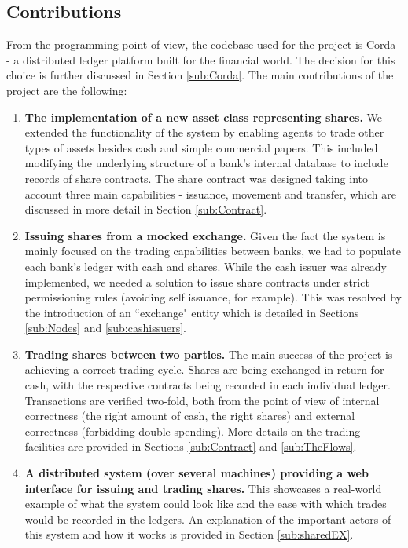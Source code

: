 \documentclass[12pt,twoside]{article}
\begin{document}
\subsection{Contributions}
\label{sec:Contributions}
From the programming point of view, the codebase used for the project is Corda - a distributed ledger platform built for the financial world. The decision for this choice is further discussed in Section \ref{sub:Corda}. The main contributions of the project are the following:
\begin{enumerate}
\item \textbf{The implementation of a new asset class representing shares.} We extended the functionality of the system by enabling agents to trade other types of assets besides cash and simple commercial papers. This included modifying the underlying structure of a bank's internal database to include records of share contracts. The share contract was designed taking into account three main capabilities - issuance, movement and transfer, which are discussed in more detail in Section \ref{sub:Contract}.
\item \textbf{Issuing shares from a mocked exchange.} Given the fact the system is mainly focused on the trading capabilities between banks, we had to populate each bank's ledger with cash and shares. While the cash issuer was already implemented, we needed a solution to issue share contracts under strict permissioning rules (avoiding self issuance, for example). This was resolved by the introduction of an ``exchange" entity which is detailed in Sections \ref{sub:Nodes} and \ref{sub:cashissuers}.
\item \textbf{Trading shares between two parties.} The main success of the project is achieving a correct trading cycle. Shares are being exchanged in return for cash, with the respective contracts being recorded in each individual ledger. Transactions are verified two-fold, both from the point of view of internal correctness (the right amount of cash, the right shares) and external correctness (forbidding double spending). More details on the trading facilities are provided in Sections \ref{sub:Contract} and \ref{sub:TheFlows}.
\item \textbf{A distributed system (over several machines) providing a web interface for issuing and trading shares.} This showcases a real-world example of what the system could look like and the ease with which trades would be recorded in the ledgers. An explanation of the important actors of this system and how it works is provided in Section \ref{sub:sharedEX}.

\end{enumerate}
\end{document}
